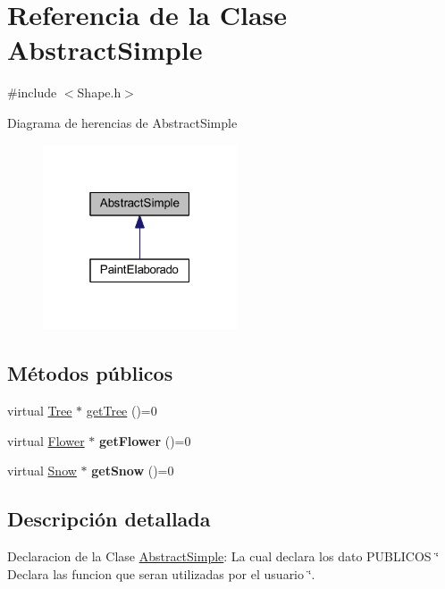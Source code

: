 \hypertarget{class_abstract_simple}{}\section{Referencia de la Clase Abstract\+Simple}
\label{class_abstract_simple}


{\ttfamily \#include $<$Shape.\+h$>$}



Diagrama de herencias de Abstract\+Simple
\nopagebreak
\begin{figure}[H]
\begin{center}
\leavevmode
\includegraphics[width=163pt]{class_abstract_simple__inherit__graph}
\end{center}
\end{figure}
\subsection*{Métodos públicos}
\begin{DoxyCompactItemize}
\item 
virtual \mbox{\hyperlink{class_tree}{Tree}} $\ast$ \mbox{\hyperlink{class_abstract_simple_ad90f5d7d3415a29af8bbf10ad8d89772}{get\+Tree}} ()=0
\item 
\mbox{\label{class_abstract_simple_a32da8b68a506bf223035acc62451724f}} 
virtual \mbox{\hyperlink{class_flower}{Flower}} $\ast$ {\bfseries get\+Flower} ()=0
\item 
\mbox{\label{class_abstract_simple_aad971de50be686f491109651a387ce5e}} 
virtual \mbox{\hyperlink{class_snow}{Snow}} $\ast$ {\bfseries get\+Snow} ()=0
\end{DoxyCompactItemize}


\subsection{Descripción detallada}
Declaracion de la Clase \mbox{\hyperlink{class_abstract_simple}{Abstract\+Simple}}\+: La cual declara los dato P\+U\+B\+L\+I\+C\+OS \char`\"{} Declara las funcion que seran utilizadas por el usuario \char`\"{}. 

